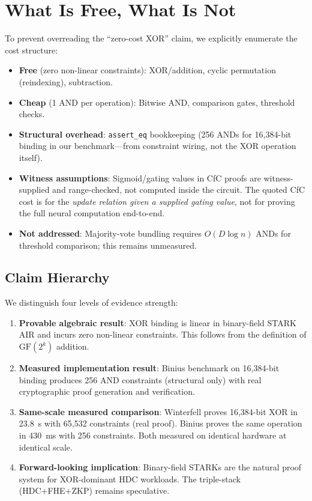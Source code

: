 \documentclass[11pt,twocolumn]{article}
\begin{document}
\section{What Is Free, What Is Not}
\label{sec:costs}

To prevent overreading the ``zero-cost XOR'' claim, we explicitly enumerate the cost structure:

\begin{itemize}
    \item \textbf{Free} (zero non-linear constraints): XOR/addition, cyclic permutation (reindexing), subtraction.
    \item \textbf{Cheap} (1 AND per operation): Bitwise AND, comparison gates, threshold checks.
    \item \textbf{Structural overhead}: \texttt{assert\_eq} bookkeeping (256 ANDs for 16,384-bit binding in our benchmark---from constraint wiring, not the XOR operation itself).
    \item \textbf{Witness assumptions}: Sigmoid/gating values in CfC proofs are witness-supplied and range-checked, not computed inside the circuit. The quoted CfC cost is for the \emph{update relation given a supplied gating value}, not for proving the full neural computation end-to-end.
    \item \textbf{Not addressed}: Majority-vote bundling requires $O(D \log n)$ ANDs for threshold comparison; this remains unmeasured.
\end{itemize}

\subsection{Claim Hierarchy}

We distinguish four levels of evidence strength:

\begin{enumerate}
    \item \textbf{Provable algebraic result}: XOR binding is linear in binary-field STARK AIR and incurs zero non-linear constraints. This follows from the definition of $\mathrm{GF}(2^k)$ addition.
    \item \textbf{Measured implementation result}: Binius benchmark on 16,384-bit binding produces 256 AND constraints (structural only) with real cryptographic proof generation and verification.
    \item \textbf{Same-scale measured comparison}: Winterfell proves 16,384-bit XOR in 23.8~s with 65,532 constraints (real proof). Binius proves the same operation in 430~ms with 256 constraints. Both measured on identical hardware at identical scale.
    \item \textbf{Forward-looking implication}: Binary-field STARKs are the natural proof system for XOR-dominant HDC workloads. The triple-stack (HDC+FHE+ZKP) remains speculative.
\end{enumerate}
\end{document}
